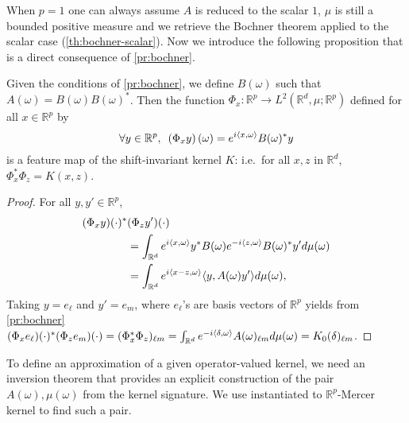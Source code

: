 \documentclass[twocolumn]{article}
\begin{document}
When $p=1$ one can always assume $A$ is reduced to the scalar $1$, $\mu$ is
still a bounded positive measure and we retrieve the Bochner theorem applied to
the scalar case (\cref{th:bochner-scalar}).  Now we introduce the following
proposition that is a direct consequence of \cref{pr:bochner}. %
\begin{proposition}
        \label{pr:fourier_feature_map} Given the conditions of
        \cref{pr:bochner}, we define $B(\omega)$ such that $A(\omega) =
        B(\omega)B(\omega)^*$. Then the function $\Phi_x:\mathbb{R}^p
        \rightarrow L^2(\mathbb{R}^d,\mu;\mathbb{R}^p)$ defined for all $x \in
        \mathbb{R}^p$ by
    \begin{equation}
        \label{eq:feature_shiftinv_operator}
        \forall y\in\mathbb{R}^p,\enskip \left(\Phi_x y
        \right)(\omega)=e^{i\langle x,\omega\rangle}B(\omega)^*y
    \end{equation}
    is a feature map of the shift-invariant kernel $K$: i.e.~for all $x,z$ in
    $\mathbb{R}^d$, $\Phi_x^*\Phi_z=K(x,z)$.
\end{proposition}
\begin{proof}
    For all $y, y'\in \mathbb{R}^p$,
    \begin{equation*}
        \begin{aligned}
            (\Phi_x y)(\cdot)^* & (\Phi_z y')(\cdot) \\
            &= \int_{\mathbb{R}^d}e^{i\langle x,\omega\rangle}y^*
            B(\omega)e^{-i\langle z,\omega\rangle}B(\omega)^* y'd\mu(\omega) \\
            &= \int_{\mathbb{R}^d}e^{i\langle x-z,\omega\rangle}\langle y,A(\omega)y'\rangle
            d\mu(\omega),
        \end{aligned}
    \end{equation*} %
    Taking $y=e_\ell$ and $y'=e_m$, where $e_\ell$'s are basis vectors of
    $\mathbb{R}^p$ yields from \cref{pr:bochner} $(\Phi_x
    e_\ell)(\cdot)^* (\Phi_z e_m)(\cdot) = (\Phi_x^*
    \Phi_z)_{\ell m} =
    \int_{\mathbb{R}^d}e^{-i\langle\delta,\omega\rangle}A(\omega)_{\ell
    m}d\mu(\omega) = K_0(\delta)_{\ell m}$. %
\end{proof} %
To define an approximation of a given operator-valued kernel, we need an
inversion theorem that provides an explicit construction of the pair
$A(\omega), \mu(\omega)$ from the kernel signature. We use \cite[Prop.
14.]{Carmeli2010} instantiated to $\mathbb{R}^p$-Mercer kernel to find such a
pair.
\end{document}
